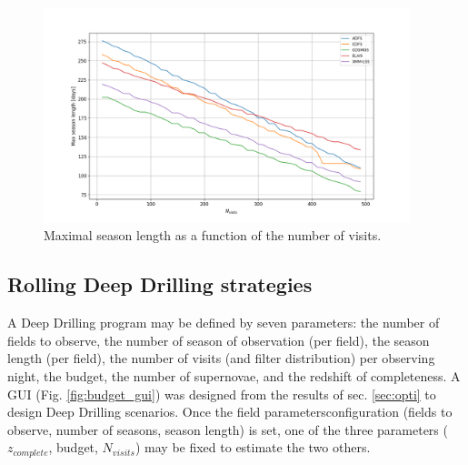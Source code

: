 \documentclass[\docopts]{\docclass}
\newcommand{\zcomp}{\mbox{$z_{complete}$}}
\newcommand{\nvisits}{$N_{visits}$}
\begin{document}
\begin{figure}[htbp]
\begin{center}
  \includegraphics[width=0.95\textwidth]{seasonlength_nvisits.png}
 \caption{Maximal season length as a function of the number of visits.}\label{fig:seasonlength_nvisits}
\end{center}
\end{figure}

\subsection{Rolling Deep Drilling strategies}
A Deep Drilling program may be defined by seven parameters: the number of fields to observe, the number of season of observation (per field), the season length (per field), the number of visits (and filter distribution) per observing night, the budget, the number of supernovae, and the redshift of completeness. A GUI (Fig. \ref{fig:budget_gui}) was designed from the results of sec. \ref{sec:opti} to design Deep Drilling scenarios. Once the field parametersconfiguration (fields to observe, number of seasons, season length) is set, one of the three parameters (\zcomp, budget, \nvisits) may be fixed to estimate the two others. 
\end{document}
